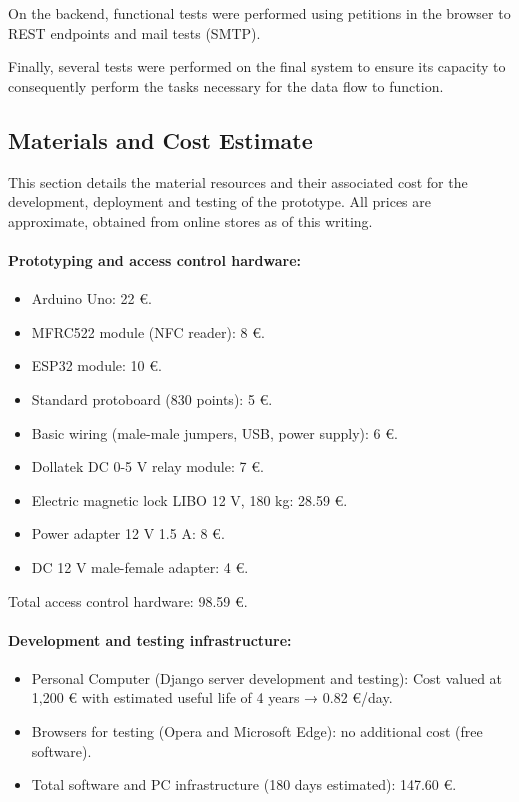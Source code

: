 On the backend, functional tests were performed using petitions in the browser to REST endpoints and mail tests (SMTP).

Finally, several tests were performed on the final system to ensure its capacity to consequently perform the tasks necessary for the data flow to function.

\subsection{Materials and Cost Estimate}

This section details the material resources and their associated cost for the development, deployment and testing of the prototype. All prices are approximate, obtained from online stores as of this writing.

\paragraph{Prototyping and access control hardware:}

\begin{itemize}
	\item Arduino Uno: 22 €.
	\item MFRC522 module (NFC reader): 8 €.
	\item ESP32 module: 10 €.
	\item Standard protoboard (830 points): 5 €.
	\item Basic wiring (male-male jumpers, USB, power supply): 6 €.
	\item Dollatek DC 0-5 V relay module: 7 €.
	\item Electric magnetic lock LIBO 12 V, 180 kg: 28.59 €.
	\item Power adapter 12 V 1.5 A: 8 €.
	\item DC 12 V male-female adapter: 4 €.
\end{itemize}

Total access control hardware: 98.59 €.

\paragraph{Development and testing infrastructure:}

\begin{itemize}
	\item Personal Computer (Django server development and testing): Cost valued at 1,200 € with estimated useful life of 4 years → 0.82 €/day.
	\item Browsers for testing (Opera and Microsoft Edge): no additional cost (free software).
	\item Total software and PC infrastructure (180 days estimated): 147.60 €.
\end{itemize}

